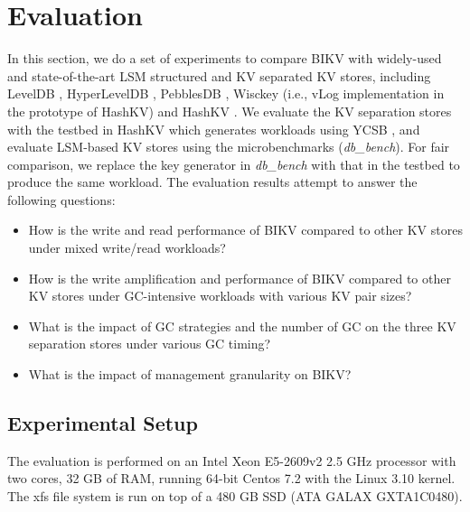 \documentclass[sigconf]{acmart}
\begin{document}
\section{Evaluation} \label{sec4}
In this section, we do a set of experiments to compare BIKV with widely-used and state-of-the-art LSM structured and KV separated KV stores, including LevelDB \cite{LevelDB}, HyperLevelDB \cite{HyperLevelDB}, PebblesDB \cite{PebblesDB}, Wisckey \cite{Wisckey} (i.e., vLog implementation in the prototype of HashKV) and HashKV \cite{HashKV}. We evaluate the KV separation stores with the testbed in HashKV which generates workloads using YCSB \cite{YCSB}, and evaluate LSM-based KV stores using the microbenchmarks (\textit{db\_bench}). For fair comparison, we replace the key generator in \textit{db\_bench} with that in the testbed to produce the same workload. The evaluation results attempt to answer the following questions:
\begin{itemize}
	\item How is the write and read performance of BIKV compared to other KV stores under mixed write/read workloads?
	\item How is the write amplification and performance of BIKV compared to other KV stores under GC-intensive workloads with various KV pair sizes?
	\item What is the impact of GC strategies and the number of GC on the three  KV separation stores under various GC timing?  
	\item What is the impact of management granularity on BIKV?
\end{itemize}

\subsection{Experimental Setup}
The evaluation is performed on an Intel Xeon E5-2609v2 2.5 GHz processor with two cores, 32 GB of RAM, running 64-bit Centos 7.2 with the Linux 3.10 kernel. The xfs file system is run on top of a 480 GB SSD (ATA GALAX GXTA1C0480). 
\end{document}
